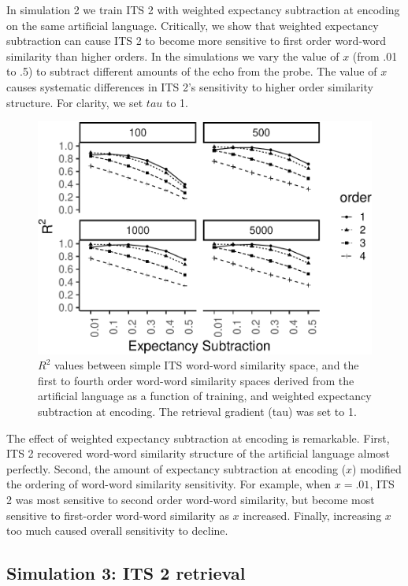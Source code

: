 \documentclass[
  jou]{apa6}
\begin{document}
In simulation 2 we train ITS 2 with weighted expectancy subtraction at encoding on the same artificial language. Critically, we show that weighted expectancy subtraction can cause ITS 2 to become more sensitive to first order word-word similarity than higher orders. In the simulations we vary the value of \(x\) (from .01 to .5) to subtract different amounts of the echo from the probe. The value of \(x\) causes systematic differences in ITS 2's sensitivity to higher order similarity structure. For clarity, we set \(tau\) to 1.

\begin{figure}
\centering
\includegraphics{ITS_cogsci_files/figure-latex/ITSencodinglinear-1.pdf}
\caption{\label{fig:ITSencodinglinear}\(R^2\) values between simple ITS word-word similarity space, and the first to fourth order word-word similarity spaces derived from the artificial language as a function of training, and weighted expectancy subtraction at encoding. The retrieval gradient (tau) was set to 1.}
\end{figure}

The effect of weighted expectancy subtraction at encoding is remarkable. First, ITS 2 recovered word-word similarity structure of the artificial language almost perfectly. Second, the amount of expectancy subtraction at encoding (\(x\)) modified the ordering of word-word similarity sensitivity. For example, when \(x=.01\), ITS 2 was most sensitive to second order word-word similarity, but become most sensitive to first-order word-word similarity as \(x\) increased. Finally, increasing \(x\) too much caused overall sensitivity to decline.

\hypertarget{simulation-3-its-2-retrieval}{%
\subsection{Simulation 3: ITS 2 retrieval}\label{simulation-3-its-2-retrieval}}
\end{document}

